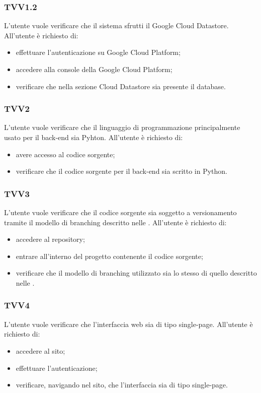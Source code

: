 		\subsubsection{TVV1.2}
			L'utente vuole verificare che il sistema sfrutti il Google Cloud Datastore. All'utente è richiesto di:
			\begin{itemize}
				\item effettuare l'autenticazione su Google Cloud Platform;
				\item accedere alla console della Google Cloud Platform;
				\item verificare che nella sezione Cloud Datastore sia presente il database.
			\end{itemize}
			
		\subsubsection{TVV2}
			L'utente vuole verificare che il linguaggio di programmazione principalmente usato per il back-end sia Pyhton. All'utente è richiesto di:
			\begin{itemize}
				\item avere accesso al codice sorgente;
				\item verificare che il codice sorgente per il back-end sia scritto in Python.
			\end{itemize}
			
		\subsubsection{TVV3}
			L'utente vuole verificare che il codice sorgente sia soggetto a versionamento tramite il modello di branching descritto nelle \docNameVersionNdP. All'utente è richiesto di:
			\begin{itemize}
				\item accedere al repository;
				\item entrare all'interno del progetto contenente il codice sorgente;
				\item verificare che il modello di branching utilizzato sia lo stesso di quello descritto nelle \docNameVersionNdP.
			\end{itemize}
			
		\subsubsection{TVV4}
			L'utente vuole verificare che l'interfaccia web sia di tipo single-page. All'utente è richiesto di:
			\begin{itemize}
				\item accedere al sito;
				\item effettuare l'autenticazione;
				\item verificare, navigando nel sito, che l'interfaccia sia di tipo single-page.
			\end{itemize}
			

